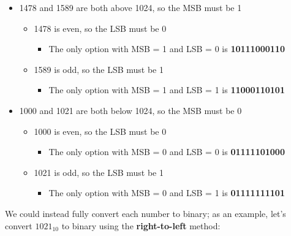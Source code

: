 \begin{itemize}
  \item 1478 and 1589 are both above 1024, so the MSB must be 1
  \begin{itemize}
    \item 1478 is even, so the LSB must be 0
    \begin{itemize}
      \item The only option with MSB = 1 and LSB = 0 is \textbf{10111000110}
    \end{itemize}
    \item 1589 is odd, so the LSB must be 1
    \begin{itemize}
      \item The only option with MSB = 1 and LSB = 1 is \textbf{11000110101}
    \end{itemize}
  \end{itemize}
  \item 1000 and 1021 are both below 1024, so the MSB must be 0
  \begin{itemize}
    \item 1000 is even, so the LSB must be 0
    \begin{itemize}
      \item The only option with MSB = 0 and LSB = 0 is \textbf{01111101000}
    \end{itemize}
    \item 1021 is odd, so the LSB must be 1
    \begin{itemize}
      \item The only option with MSB = 0 and LSB = 1 is \textbf{01111111101}
    \end{itemize}
  \end{itemize}
\end{itemize}

\vspace{1em}
We could instead fully convert each number to binary; as an example, let's convert $1021_{10}$ to binary using the \textbf{right-to-left} method:

